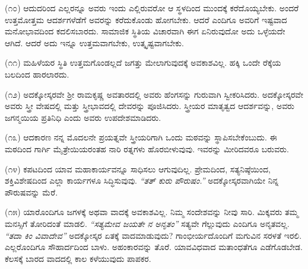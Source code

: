 \vspace{0.12cm}

(೧೦) ಆದುದರಿಂದ ಎಲ್ಲರನ್ನೂ ಅವರು ಇಂದು ಎಲ್ಲಿರುವರೋ ಆ ಸ್ಥಳದಿಂದ ಮುಂದಕ್ಕೆ ಕರೆದೊಯ್ಯಬೇಕು. ಅಂದರೆ ಉತ್ತಮೋತ್ತಮ ಆದರ್ಶಗಳೆಡೆಗೆ ಅವರನ್ನು ಕರೆದುಕೊಂಡು ಹೋಗಬೇಕು. ಆದರೆ ಎಂದಿಗೂ ಅವರಿಗೆ ಇಷ್ಟವಾದ ಮನೋಭಾವದಿಂದ ಕದಲಿಸಬಾರದು. ಸಾಮಾಜಿಕ ಸ್ಥಿತಿಯ ವಿಚಾರವಾಗಿ ಈಗ ಏನಿರುವುದೋ ಅದು ಒಳ್ಳೆಯದೇ ಆಗಿದೆ. ಆದರೆ ಅದು ಇನ್ನೂ ಉತ್ತಮವಾಗಬೇಕು, ಉತ್ಕೃಷ್ಟವಾಗಬೇಕು.

\vspace{0.1cm}

(೧೧) ಮಹಿಳೆಯರ ಸ್ಥಿತಿ ಉತ್ತಮಗೊಂಡಲ್ಲದೆ ಜಗತ್ತು ಮೇಲಾಗುವುದಕ್ಕೆ ಅವಕಾಶವಿಲ್ಲ. ಹಕ್ಕಿ ಒಂದೇ ರೆಕ್ಕೆಯ ಬಲದಿಂದ ಹಾರಲಾರದು.

\vspace{0.12cm}

(೧೨) ಅದಕ್ಕೋಸ್ಕರವೇ ಶ‍್ರೀ ರಾಮಕೃಷ್ಣ ಅವತಾರದಲ್ಲಿ ಅವರು ಹೆಂಗಸನ್ನು ಗುರುವಾಗಿ ಸ್ವೀಕರಿಸಿದರು. ಅದಕ್ಕೋಸ್ಕರವೇ ಅವರು ಸ್ತ್ರೀ ವೇಷದಲ್ಲಿ ಮತ್ತು ಸ್ತ್ರೀಭಾವದಲ್ಲಿ ದೇವರನ್ನು ಪೂಜಿಸಿದರು. ಸ್ತ್ರೀಯರ ಮಾತೃತ್ವದ ಆದರ್ಶವನ್ನು, ಅವರು ಜಗನ್ಮಯಿಯ ಪ್ರತಿನಿಧಿ ಎಂದು ಅವರು ಉಪದೇಶಮಾಡಿದರು.

\vspace{0.1cm}

(೧೩) ಆದಕಾರಣ ನನ್ನ ಮೊದಲನೇ ಪ್ರಯತ್ನವೇ ಸ್ತ್ರೀಯರಿಗಾಗಿ ಒಂದು ಮಠವನ್ನು ಸ್ಥಾಪಿಸಬೇಕೆಂಬುದು. ಈ ಮಠದಿಂದ ಗಾರ್ಗಿ ಮೈತ್ರೇಯಿಯರಂತಹ ನಾರಿ ರತ್ನಗಳು ಹೊರಬೀಳುವುವು. ಇವರನ್ನು ಮೀರಿದವರೂ ಬರುವರು.

\vspace{0.12cm}

(೧೪) ಕಪಟದಿಂದ ಯಾವ ಮಹಾಕಾರ್ಯವನ್ನೂ ಸಾಧಿಸಲು ಆಗುವುದಿಲ್ಲ. ಪ್ರೇಮದಿಂದ, ಸತ್ಯನಿಷ್ಠೆಯಿಂದ, ಶಕ್ತಿವಿಶೇಷದಿಂದ ಎಲ್ಲಾ ಕಾರ್ಯಗಳೂ ಸಿದ್ಧಿಸುವುವು. \textit{“ತತ್ ಕುರು ಪೌರುಷಂ.” } ಅದಕ್ಕೋಸ್ಕರವಾಗಿಯೇ ನಿನ್ನ ಪೌರುಷವನ್ನು ಮೆರೆ.

\vspace{0.12cm}

(೧೫) ಯಾರೊಂದಿಗೂ ಜಗಳಕ್ಕೆ ಅಥವಾ ವಾದಕ್ಕೆ ಅವಕಾಶವಿಲ್ಲ. ನಿಮ್ಮ ಸಂದೇಶವನ್ನು ನೀವು ಸಾರಿ. ಮಿಕ್ಕವರು ತಮ್ಮ ಮನಸ್ಸಿಗೆ ತೋರಿದಂತೆ ಮಾಡಲಿ. \textit{“ಸತ್ಯಮೇವ ಜಯತೇ ನ ಅನೃತಂ”} \enginline{-} ಸತ್ಯವೇ ಗೆಲ್ಲುವುದು ಎಂದಿಗೂ ಅನೃತವಲ್ಲ. \textit{“ತದಾ ಕಿಂ ವಿವಾದೇವ”}\enginline{-} ಅದಕ್ಕೋಸ್ಕರ ಏತಕ್ಕೆ ವಾದಮಾಡುವುದು? ಗಾಂಭೀರ್ಯದೊಂದಿಗೆ ಮಗುವಿನ ಸರಳತೆ ಇರಲಿ. ಎಲ್ಲರೊಂದಿಗೂ ಸೌಹಾರ್ದದಿಂದ ಬಾಳು. ಅಹಂಕಾರವನ್ನು ತೊರೆ. ಯಾವ\break ವಿಧವಾದ ಮತಾಂಧತೆಗೂ ಎಡೆಗೊಡಬೇಡ. ಕೆಲಸಕ್ಕೆ ಬಾರದ ವಾದದಲ್ಲಿ ಕಾಲ ಕಳೆಯುವುದು ಪಾಪಕರ.

